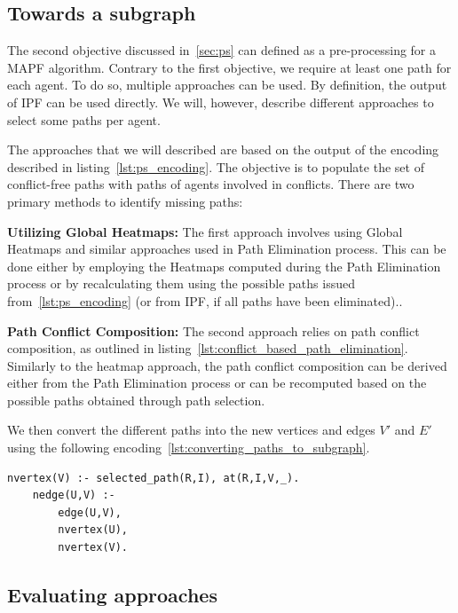\subsection{Towards a subgraph}

The second objective discussed in~\ref{sec:ps} can defined as a pre-processing for a MAPF algorithm. Contrary to the first objective, we require at least one path for each agent. To do so, multiple approaches can be used. By definition, the output of IPF can be used directly. We will, however, describe different approaches to select some paths per agent. 

The approaches that we will described are based on the output of the encoding described in listing~\ref{lst:ps_encoding}.
The objective is to populate the set of conflict-free paths with paths of agents involved in conflicts. There are two primary methods to identify missing paths:

\noindent\textbf{Utilizing Global Heatmaps:} The first approach involves using Global Heatmaps and similar approaches used in Path Elimination process. This can be done either by employing the Heatmaps computed during the Path Elimination process or by recalculating them using the possible paths issued from~\ref{lst:ps_encoding}  (or from IPF, if all paths have been eliminated)..

\noindent\textbf{Path Conflict Composition:} The second approach relies on path conflict composition, as outlined in listing~\ref{lst:conflict_based_path_elimination}. Similarly to the heatmap approach, the path conflict composition can be derived either from the Path Elimination process or can be recomputed based on the possible paths obtained through path selection.


We then convert the different paths into the new vertices and edges \(V'\) and \(E'\) using the following encoding~\ref{lst:converting_paths_to_subgraph}.

\begin{minipage}[H]{\linewidth}
\begin{lstlisting}[style=mystyle, caption={Converting path to subgraph}, label={lst:converting_paths_to_subgraph}]
    nvertex(V) :- selected_path(R,I), at(R,I,V,_).
    nedge(U,V) :- 
        edge(U,V), 
        nvertex(U), 
        nvertex(V).
\end{lstlisting}
\end{minipage}


\subsection{Evaluating approaches}

